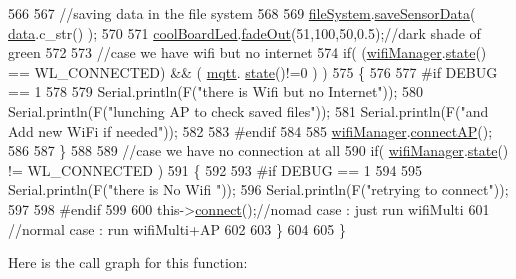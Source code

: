 \begin{DoxyCode}
566     
567     \textcolor{comment}{//saving data in the file system}
568     
569     \hyperlink{classCoolBoard_a42c2586fbb13ff7f06538e9284e8538d}{fileSystem}.\hyperlink{classCoolFileSystem_afa3a4feae94871d4d3b6bebb701c2e67}{saveSensorData}( \hyperlink{classCoolBoard_a427fb753dd8575bdf821c70a5c63d695}{data}.c\_str() );
570 
571     \hyperlink{classCoolBoard_a1b1d3c684a5baa56b08486e192fd8e97}{coolBoardLed}.\hyperlink{classCoolBoardLed_a93d545679237e8cc858324367149775c}{fadeOut}(51,100,50,0.5);\textcolor{comment}{//dark shade of green}
572 
573     \textcolor{comment}{//case we have wifi but no internet}
574     \textcolor{keywordflow}{if}( (\hyperlink{classCoolBoard_acd88e6003606b47479ebba81e4aceeca}{wifiManager}.\hyperlink{classCoolWifi_a1c7b4d82a4098d346e7593dce92039fa}{state}() == WL\_CONNECTED) && ( \hyperlink{classCoolBoard_a2399f44d7c23c1149a335cb3b46d90f1}{mqtt}.
      \hyperlink{classCoolMQTT_a5d003307eff78efbd585e42b43b72b6d}{state}()!=0 ) )
575     \{
576     
577 \textcolor{preprocessor}{    #if DEBUG == 1}
578         
579         Serial.println(F(\textcolor{stringliteral}{"there is Wifi but no Internet"}));
580         Serial.println(F(\textcolor{stringliteral}{"lunching AP to check saved files"}));
581         Serial.println(F(\textcolor{stringliteral}{"and Add new WiFi if needed"}));
582     
583 \textcolor{preprocessor}{    #endif}
584         
585         \hyperlink{classCoolBoard_acd88e6003606b47479ebba81e4aceeca}{wifiManager}.\hyperlink{classCoolWifi_a7c857f27161782f5ef1d62d552aff971}{connectAP}();
586         
587     \}
588     
589     \textcolor{comment}{//case we have no connection at all}
590     \textcolor{keywordflow}{if}( \hyperlink{classCoolBoard_acd88e6003606b47479ebba81e4aceeca}{wifiManager}.\hyperlink{classCoolWifi_a1c7b4d82a4098d346e7593dce92039fa}{state}() != WL\_CONNECTED )
591     \{
592     
593 \textcolor{preprocessor}{    #if DEBUG == 1}
594         
595         Serial.println(F(\textcolor{stringliteral}{"there is No Wifi "}));
596         Serial.println(F(\textcolor{stringliteral}{"retrying to connect"}));
597     
598 \textcolor{preprocessor}{    #endif}
599         
600         this->\hyperlink{classCoolBoard_a519de78b807f8ec6463ff484eb925918}{connect}();\textcolor{comment}{//nomad case : just run wifiMulti}
601                 \textcolor{comment}{//normal case : run wifiMulti+AP}
602         
603     \}   
604 
605 \}
\end{DoxyCode}
Here is the call graph for this function\+:
\nopagebreak
